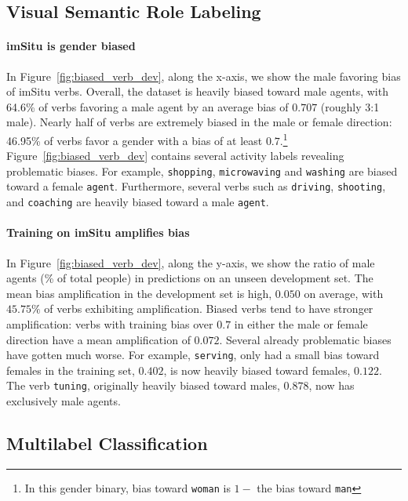 \subsection{Visual Semantic Role Labeling}
\paragraph{imSitu is gender biased}
In Figure~\ref{fig:biased_verb_dev}, along the x-axis, we show the male favoring bias of imSitu verbs. 
Overall, the dataset is heavily biased toward male agents, with 64.6\% of verbs favoring a male agent by an average bias of $0.707$ (roughly 3:1 male).
Nearly half of verbs are extremely biased in the male or female direction: 46.95\% of verbs favor a gender with a bias of at least $0.7$.\footnote{In this gender binary, bias toward \texttt{woman} is $1 - $ the bias toward \texttt{man}}
Figure~\ref{fig:biased_verb_dev} contains several activity labels revealing problematic biases.
For example, \texttt{shopping}, \texttt{microwaving} and \texttt{washing} are biased toward a female \texttt{agent}.
Furthermore, several verbs such as \texttt{driving}, \texttt{shooting}, and \texttt{coaching} are heavily biased toward a male \texttt{agent}.

\paragraph{Training on imSitu amplifies bias}
In Figure~\ref{fig:biased_verb_dev}, along the y-axis, we show the ratio of male agents (\% of total people) in predictions on an unseen development set.
The mean bias amplification in the development set is high, $0.050$ on average, with $45.75\%$ of verbs exhibiting amplification.
Biased verbs tend to have stronger amplification: verbs with training bias over $0.7$ in either the male or female direction have a mean amplification of $0.072$.
Several already problematic biases have gotten much worse.
For example, \texttt{serving}, only had a small bias toward females in the training set, $0.402$, is now heavily biased toward females, $0.122$.
The verb \texttt{tuning}, originally heavily biased toward males, $0.878$, now has exclusively male agents.

\subsection{Multilabel Classification}
